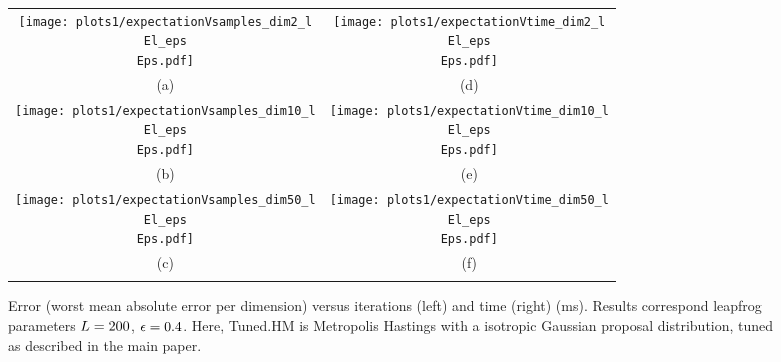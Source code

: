 \begin{figure*}%
\begin{center}
\begin{tabular}{cc}
   \hspace{-5mm} \texttt{[image: plots1/expectationVsamples\_dim2\_l\\El\_eps\\Eps.pdf]} 
& \hspace{-3mm} \texttt{[image: plots1/expectationVtime\_dim2\_l\\El\_eps\\Eps.pdf]} 
\vspace{-1.5mm}
\\
   \hspace{-5mm} \footnotesize(a) 
& \hspace{-4mm} \footnotesize(d) 
\\
\hspace{-5mm} \texttt{[image: plots1/expectationVsamples\_dim10\_l\\El\_eps\\Eps.pdf]} 
& \hspace{-3mm} \texttt{[image: plots1/expectationVtime\_dim10\_l\\El\_eps\\Eps.pdf]} 
\vspace{-1.5mm}
\\
   \hspace{-5mm} \footnotesize(b) 
& \hspace{-4mm} \footnotesize(e) 
\\
\hspace{-5mm} \texttt{[image: plots1/expectationVsamples\_dim50\_l\\El\_eps\\Eps.pdf]} 
& \hspace{-3mm} \texttt{[image: plots1/expectationVtime\_dim50\_l\\El\_eps\\Eps.pdf]} 
\vspace{-1.5mm}
\\
\hspace{-5mm} \footnotesize(c) 
& \hspace{-4mm} \footnotesize(f) 
\\
\multicolumn{2}{c}{}
\end{tabular}
\end{center}
\vspace{-8mm}
\caption{\footnotesize
Error (worst mean absolute error per dimension) versus iterations (left) and time (right) (ms). 
Results correspond leapfrog parameters $L =200$, $\epsilon = 0.4$. Here, Tuned.HM is Metropolis Hastings with a isotropic Gaussian proposal distribution, tuned as described in the main paper.
} 
\end{figure*}
